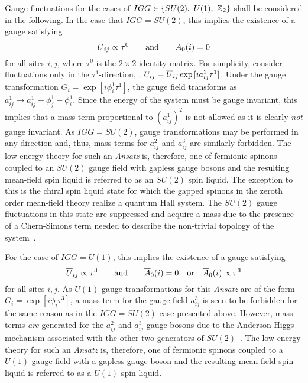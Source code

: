 Gauge fluctuations for the cases of $IGG \in \{SU(2),~U(1),~\mathbb{Z}_{2}\}$ shall be considered in the following.
In the case that $IGG = SU(2)$, this implies the existence of a gauge satisfying
%
\begin{equation}
	\overline{U}_{ij} \propto \tau^0 \qquad {\rm and } \qquad \overline{A}_0(i) = 0
\end{equation}
%
for all sites $i,j$, where $\tau^0$ is the $2\times 2$ identity matrix.
For simplicity, consider fluctuations only in the $\tau^1$-direction, \ie, $U_{ij} = \overline{U}_{ij} \exp{[i a^1_{ij} \tau^1]}$.
Under the gauge transformation $G_i = \exp{[i \phi^1_i \tau^1]}$, the gauge field transforms as $a^1_{ij} \rightarrow a^1_{ij} + \phi^1_j - \phi^1_i$.
Since the energy of the system must be gauge invariant, this implies that a mass term proportional to $(a^1_{ij})^2$ is not allowed as it is clearly \textit{not} gauge invariant.
As $IGG = SU(2)$, gauge transformations may be performed in any direction and, thus, mass terms for $a^2_{ij}$ and $a^3_{ij}$ are similarly forbidden.
The low-energy theory for such an \textit{Ansatz} is, therefore, one of fermionic spinons coupled to an $SU(2)$ gauge field with gapless gauge bosons and the resulting mean-field spin liquid is referred to as an $SU(2)$ spin liquid.
The exception to this is the chiral spin liquid state for which the gapped spinons in the zeroth order mean-field theory realize a quantum Hall system.
The $SU(2)$ gauge fluctuations in this state are suppressed and acquire a mass due to the presence of a Chern-Simons term needed to describe the non-trivial topology of the system~\cite{KalmeyerPRL1987,WenPRB1989b}.

For the case of $IGG = U(1)$, this implies the existence of a gauge satisfying
%
\begin{equation}
	\overline{U}_{ij} \propto \tau^3 \qquad {\rm and } \qquad \overline{A}_0(i) = 0 \quad {\rm or } \quad \overline{A}_0(i) \propto \tau^3
\end{equation}
%
for all sites $i,j$.
As $U(1)$-gauge transformations for this \textit{Ansatz} are of the form $G_i = \exp{[i \phi_i \tau^3]}$, a mass term for the gauge field $a^3_{ij}$ is seen to be forbidden for the same reason as in the $IGG = SU(2)$ case presented above.
However, mass terms \textit{are} generated for the $a^2_{ij}$ and $a^3_{ij}$ gauge bosons due to the Anderson-Higgs mechanism associated with the other two generators of $SU(2)$~\cite{WenPRB1991,WenPRB2002,Wen2004}.
The low-energy theory for such an \textit{Ansatz} is, therefore, one of fermionic spinons coupled to a $U(1)$ gauge field with a gapless gauge boson and the resulting mean-field spin liquid is referred to as a $U(1)$ spin liquid.


